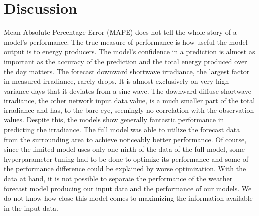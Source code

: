 \chapter{Discussion}
Mean Absolute Percentage Error (MAPE) does not tell the whole story of a model's performance. The true measure of performance is how useful the model output is to energy producers. The model's confidence in a prediction is almost as important as the accuracy of the prediction and the total energy produced over the day matters.
The forecast downward shortwave irradiance, the largest factor in measured irradiance, rarely drops. It is almost exclusively on very high variance days that it deviates from a sine wave. The downward diffuse shortwave irradiance, the other network input data value, is a much smaller part of the total irradiance and has, to the bare eye, seemingly no correlation with the observation values. Despite this, the models show generally fantastic performance in predicting the irradiance.
The full model was able to utilize the forecast data from the surrounding area to achieve noticeably better performance. Of course, since the limited model uses only one-ninth of the data of the full model, some hyperparameter tuning had to be done to optimize its performance and some of the performance difference could be explained by worse optimization.
With the data at hand, it is not possible to separate the performance of the weather forecast model producing our input data and the performance of our models. We do not know how close this model comes to maximizing the information available in the input data.


